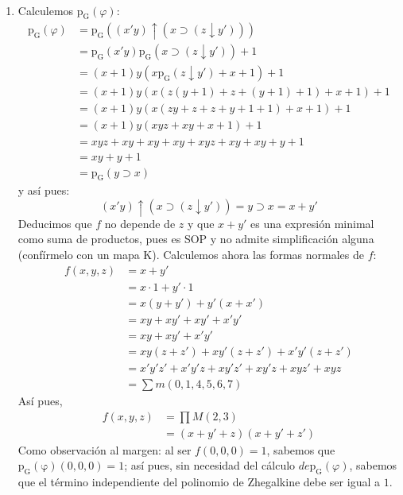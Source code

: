 \begin{solution}~
  \begin{enumerate}
  \item Calculemos $\operatorname{p_{G}}(\varphi)$:
    \begin{align*}
      \operatorname{p_{G}}(\varphi)&
          =\operatorname{p_{G}}((x'y)\uparrow(x\supset(z\downarrow y')))\\
        &=\operatorname{p_{G}}(x'y)\operatorname{p_{G}}(x\supset(z\downarrow y'))+1\\
        &=(x+1)y(x \operatorname{p_{G}}(z\downarrow y')+x+1)+1\\
        &=(x+1)y(x(z(y+1)+z+(y+1)+1)+x+1)+1\\
        &=(x+1)y(x(zy+z+z+y+1+1)+x+1)+1\\
        &=(x+1)y(xyz+xy+x+1)+1\\
        &=xyz+xy+xy+xy+xyz+xy+xy+y+1\\
        &=xy+y+1\\
        &=\operatorname{p_{G}}(y\supset x)
    \end{align*}
    y así pues:
    \begin{equation*}
      (x'y)\uparrow(x\supset(z\downarrow y'))=y\supset x=x+y'
    \end{equation*}
    Deducimos que $f$ no depende de $z$ y que $x+y'$ es una expresión
    minimal como suma de productos, pues es SOP y no admite
    simplificación alguna (confírmelo con un mapa K). Calculemos ahora
    las formas normales de $f$:
    \begin{align*}
      f(x,y,z)&=x+y'\\
              &=x\cdot 1+y'\cdot 1\\
              &=x(y+y')+y'(x+x')\\
              &=xy+xy'+xy'+x'y'\\
              &=xy+xy'+x'y'\\
              &=xy(z+z')+xy'(z+z')+x'y'(z+z')\\
              &=x'y'z'+x'y'z+xy'z'+xy'z+xyz'+xyz\\
              &=\sum m(0,1,4,5,6,7)
    \end{align*}
    Así pues,
    \begin{align*}
      f(x,y,z)&=\prod M(2,3)\\
              &=(x+y'+z)(x+y'+z')
    \end{align*}
    Como observación al margen: al ser $f(0,0,0)=1$, sabemos que
    $\operatorname{p_{G}(\varphi)}(0,0,0)=1$; así pues, sin necesidad
    del cálculo $de \operatorname{p_{G}}(\varphi)$, sabemos que el
    término independiente del polinomio de Zhegalkine debe ser igual a
    $1$.
  \end{enumerate}
\end{solution}

